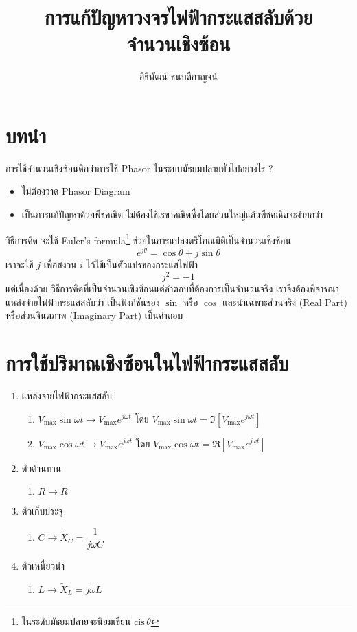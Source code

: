 \documentclass[a4paper,12pt]{article}
\title{การแก้ปัญหาวงจรไฟฟ้ากระแสสลับด้วยจำนวนเชิงซ้อน}
\author{อิธิพัฒน์ ธนบดีกาญจน์}
\begin{document}
\maketitle
\section{บทนำ}
การใช้จำนวนเชิงซ้อนดีกว่าการใช้ Phasor ในระบบมัธยมปลายทั่วไปอย่างไร ?
\begin{itemize}
	\item ไม่ต้องวาด Phasor Diagram
	\item เป็นการแก้ปัญหาด้วยพีชคณิต ไม่ต้องใช้เรขาคณิตซึ่งโดยส่วนใหญ่แล้วพีชคณิตจะง่ายกว่า
\end{itemize}

วิธีการคิด จะใช้ Euler's formula\footnote{ในระดับมัธยมปลายจะนิยมเขียน $\mathrm{cis}\,\theta$} ช่วยในการแปลงตรีโกณมิติเป็นจำนวนเชิงซ้อน
	\begin{equation}
		e^{j\theta}=\cos\theta+j\sin\theta
	\end{equation}
เราจะใช้ $j$ เพื่อสงวน $i$ ไว้ใช้เป็นตัวแปรของกระแสไฟฟ้า
	\begin{equation}
		j^2=-1
	\end{equation}
แต่เนื่องด้วย วิธีการคิดที่เป็นจำนวนเชิงซ้อนแต่คำตอบที่ต้องการเป็นจำนวนจริง เราจึงต้องพิจารณาแหล่งจ่ายไฟฟ้ากระแสสลับว่า เป็นฟังก์ชันของ $\sin$ หรือ $\cos$
และนำเฉพาะส่วนจริง (Real Part) หรือส่วนจินตภาพ (Imaginary Part) เป็นคำตอบ
\section{การใช้ปริมาณเชิงซ้อนในไฟฟ้ากระแสสลับ}
 \begin{enumerate}
	\item แหล่งจ่ายไฟฟ้ากระแสสลับ
	\begin{enumerate}
		\item $V_{\mathrm{max}}\sin\omega t\rightarrow V_{\mathrm{max}}e^{j\omega t}$ โดย $V_{\mathrm{max}}\sin\omega t=\Im\left[V_{\mathrm{max}}e^{j\omega t}\right]$
		\item $V_{\mathrm{max}}\cos\omega t\rightarrow V_{\mathrm{max}}e^{j\omega t}$ โดย $V_{\mathrm{max}}\cos\omega t=\Re\left[V_{\mathrm{max}}e^{j\omega t}\right]$
	\end{enumerate}
	\item ตัวต้านทาน
	\begin{enumerate}
		\item $R\rightarrow R$
	\end{enumerate}
\newpage
	\item ตัวเก็บประจุ
	\begin{enumerate}
		\item $C\rightarrow \tilde{X}_{C}=\dfrac{1}{j\omega C}$
	\end{enumerate}
		\item ตัวเหนี่ยวนำ
	\begin{enumerate}
		\item $L\rightarrow \tilde{X}_{L}=j\omega L$
	\end{enumerate}
\end{enumerate}
\end{document}
